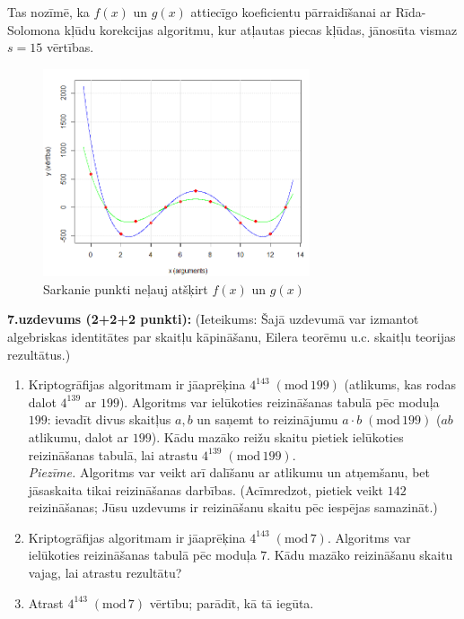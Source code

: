 \documentclass[a4paper,12pt]{article}
\begin{document}
{Tas nozīmē, ka $f(x)$ un $g(x)$ attiecīgo koeficientu pārraidīšanai ar Rīda-Solomona kļūdu korekcijas algoritmu, 
kur atļautas piecas kļūdas, jānosūta vismaz $s = 15$ vērtības. 

\begin{figure}[h!]
\begin{center}
\includegraphics[width=0.7\textwidth]{fall2019-midterm/reed-solomon-plot.png}
\caption{Sarkanie punkti neļauj atšķirt $f(x)$ un $g(x)$\label{fig:reed-solomon-plot}}
\end{center}
\end{figure}

}



\vspace{6pt}
{\bf 7.uzdevums (2+2+2 punkti):} 
(Ieteikums: Šajā uzdevumā var izmantot algebriskas identitātes par skaitļu kāpināšanu, Eilera teorēmu u.c. skaitļu teorijas rezultātus.)
\begin{enumerate}[label=(\alph*)]
\item Kriptogrāfijas algoritmam ir jāaprēķina $4^{143}\;(\text{mod}\,199)$ (atlikums, kas rodas dalot $4^{139}$ ar $199$). 
Algoritms var ielūkoties reizināšanas tabulā pēc moduļa $199$: ievadīt divus skaitļus $a,b$ un saņemt to reizinājumu 
$a\cdot{}b\;(\text{mod}\,199)$ ($ab$ atlikumu, dalot ar $199$).
Kādu mazāko reižu skaitu pietiek ielūkoties reizināšanas tabulā, lai atrastu $4^{139}\;(\text{mod}\,199)$.\\
{\em Piezīme.} Algoritms var veikt arī dalīšanu ar atlikumu un atņemšanu, bet jāsaskaita tikai reizināšanas darbības.
(Acīmredzot, pietiek veikt $142$ reizināšanas; Jūsu uzdevums ir reizināšanu skaitu pēc iespējas samazināt.)
\item Kriptogrāfijas algoritmam ir jāaprēķina $4^{143}\;(\text{mod}\,7)$. Algoritms var ielūkoties reizināšanas tabulā 
pēc moduļa $7$. Kādu mazāko reizināšanu skaitu vajag, lai atrastu rezultātu? 
\item Atrast $4^{143}\;(\text{mod}\,7)$ vērtību; parādīt, kā tā iegūta.
\end{enumerate}
\end{document}
